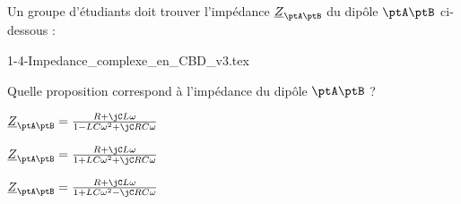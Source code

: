 

\finEntrainement


\newpage




 \hauteurLargeurCadreReponse		{6mm}{2cm}
 \initialisationEntrainement


\debutEntrainement

\begin{enonce}
	Un groupe d'étudiants doit trouver l'impédance $\underline{Z}_{\ptA\ptB}$ du dipôle $\ptA\ptB$ ci-dessous :
	
	\minusSmallskip
	

	 \begin{center}
	 	{1-4-Impedance_complexe_en_CBD_v3.tex}	
	 \end{center}  

	
	\minusMedskip
	
		Quelle proposition correspond à l'impédance du dipôle $\ptA\ptB$ ? 

	\medskip
	
	\begin{listeQCM3Colonnes}
		\item $\underline{Z}_{\ptA\ptB}=\frac{R+\jC L\omega}{1-LC\omega^2+\jC RC\omega}$\bigskip
		\item $\underline{Z}_{\ptA\ptB}=\frac{R+\jC L\omega}{1+LC\omega^2+\jC RC\omega}$
		\item $\underline{Z}_{\ptA\ptB}=\frac{R+\jC L\omega}{1+LC\omega^2-\jC RC\omega}$
	\end{listeQCM3Colonnes}
\bigskip\bigskip
\end{enonce}


